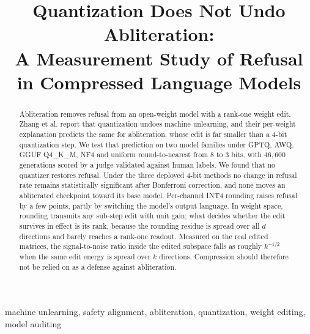 \documentclass[conference,compsoc,letterpaper]{IEEEtran}
\begin{document}
\title{Quantization Does Not Undo Abliteration:\\
A Measurement Study of Refusal in Compressed Language Models}

\author{%
\and
{}
\and
{}
}

\maketitle

\begin{abstract}
Abliteration removes refusal from an open-weight model with a rank-one weight
edit. Zhang et al. report that quantization undoes machine unlearning, and their
per-weight explanation predicts the same for abliteration, whose edit is far
smaller than a 4-bit quantization step. We test that prediction on two model
families under GPTQ, AWQ, GGUF Q4\_K\_M, NF4 and uniform round-to-nearest from
8 to 3 bits, with $46{,}600$ generations scored by a judge validated against
human labels. We found that no quantizer restores refusal. Under the three deployed 4-bit
methods no change in refusal rate remains statistically significant after
Bonferroni correction, and none moves an abliterated checkpoint toward its base
model. Per-channel INT4 rounding raises refusal by a few points, partly by
switching the model's output language. In weight space, rounding transmits any
sub-step edit with unit gain; what decides whether the edit survives in effect
is its rank, because the rounding residue is spread over all $d$ directions and
barely reaches a rank-one readout. Measured on the real edited matrices, the
signal-to-noise ratio inside the edited subspace falls as roughly $k^{-1/2}$
when the same edit energy is spread over $k$ directions. Compression should
therefore not be relied on as a defense against abliteration.
\end{abstract}

\begin{IEEEkeywords} machine unlearning, safety alignment, abliteration, quantization, weight editing, model auditing \end{IEEEkeywords}
\end{document}
